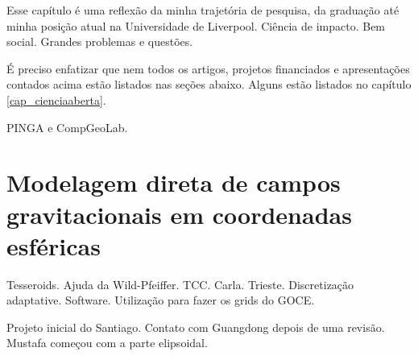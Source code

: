 \documentclass[10pt,a4paper,oneside]{book}
\begin{document}

Esse capítulo é uma reflexão da minha trajetória de pesquisa, da graduação até
minha posição atual na Universidade de Liverpool.
Ciência de impacto.
Bem social.
Grandes problemas e questões.

É preciso enfatizar que nem todos os artigos, projetos financiados e
apresentações contados acima estão listados nas seções abaixo.
Alguns estão listados no capítulo \ref{cap_cienciaaberta}.

PINGA e CompGeoLab.

\section{Modelagem direta de campos gravitacionais em coordenadas esféricas}
\label{sec_modelagemdireta}

Tesseroids.
Ajuda da Wild-Pfeiffer.
TCC.
Carla.
Trieste.
Discretização adaptative.
Software.
Utilização para fazer os grids do GOCE.

Projeto inicial do Santiago.
Contato com Guangdong depois de uma revisão.
Mustafa começou com a parte elipsoidal.
\end{document}
